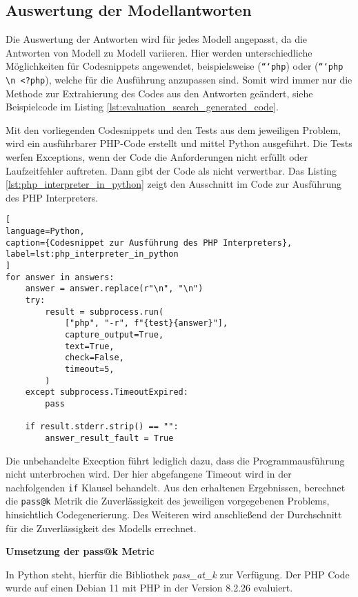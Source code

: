 \subsection{Auswertung der Modellantworten}
Die Auswertung der Antworten wird für jedes Modell angepasst, da die Antworten von Modell zu Modell variieren. Hier werden unterschiedliche Möglichkeiten für Codesnippets angewendet, beispielsweise (\texttt{```php}) oder (\texttt{```php \textbackslash n <?php}), welche für die Ausführung anzupassen sind. Somit wird immer nur die Methode zur Extrahierung des Codes aus den Antworten geändert, siehe Beispielcode im Listing \ref{lst:evaluation_search_generated_code}.\vspace{0.2cm}

Mit den vorliegenden Codesnippets und den Tests aus dem jeweiligen Problem, wird ein ausführbarer PHP-Code erstellt und mittel Python ausgeführt. Die Tests werfen Exceptions, wenn der Code die Anforderungen nicht erfüllt oder Laufzeitfehler auftreten. Dann gibt der Code als nicht verwertbar. Das Listing \ref{lst:php_interpreter_in_python} zeigt den Ausschnitt im Code zur Ausführung des PHP Interpreters.

\begin{lstlisting}[
language=Python,
caption={Codesnippet zur Ausführung des PHP Interpreters},
label=lst:php_interpreter_in_python
]
for answer in answers:
    answer = answer.replace(r"\n", "\n")
    try:
        result = subprocess.run(
            ["php", "-r", f"{test}{answer}"],
            capture_output=True,
            text=True,
            check=False,
            timeout=5,
        )
    except subprocess.TimeoutExpired:
        pass

    if result.stderr.strip() == "":
        answer_result_fault = True
\end{lstlisting}

Die unbehandelte Execption führt lediglich dazu, dass die Programmausführung nicht unterbrochen wird. Der hier abgefangene Timeout wird in der nachfolgenden \texttt{if} Klausel behandelt. Aus den erhaltenen Ergebnissen, berechnet die \texttt{pass@k} Metrik die Zuverlässigkeit des jeweiligen vorgegebenen Problems, hinsichtlich Codegenerierung. Des Weiteren wird anschließend der Durchschnitt für die Zuverlässigkeit des Modells errechnet.\vspace{0.2cm}

\textbf{Umsetzung der pass@k Metric}\vspace{0.2cm}

In Python steht, hierfür die Bibliothek \textit{pass\_at\_k} zur Verfügung. Der PHP Code wurde auf einen Debian 11 mit PHP in der Version 8.2.26 evaluiert.

